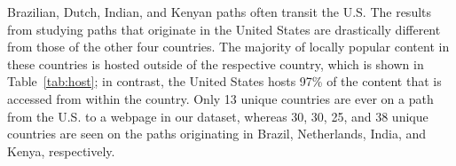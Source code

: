 Brazilian, Dutch, Indian, and Kenyan paths
often transit the U.S. The results from
studying paths that originate in the United States are drastically different from
those
of the other four countries.  The majority of locally popular content in these countries
is hosted outside of the respective country, which is shown in Table~\ref{tab:host}; in contrast, the United States hosts
97\% of the
content that is accessed from within the country.  Only 13 unique countries
are ever on a path from the U.S. to a webpage in our dataset, whereas 30, 30, 25, and 38 unique countries are seen on the paths
originating in Brazil, Netherlands, India, and Kenya, respectively.







